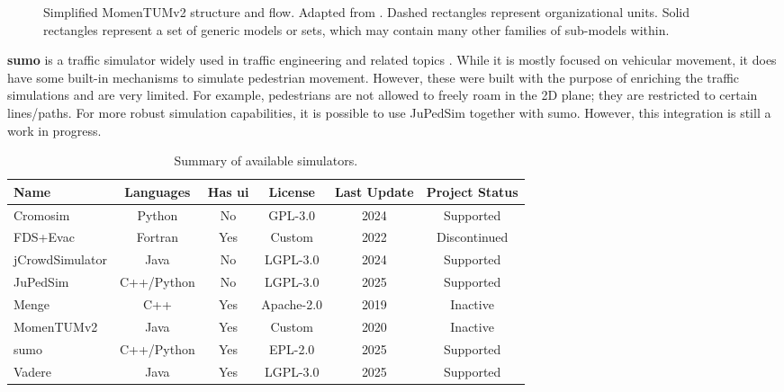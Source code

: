 \documentclass[twoside, 11pt]{article}
\begin{document}
\begin{figure}[h]
  \centering
  
  \caption[Simplified MomenTUMv2 structure and flow]{Simplified MomenTUMv2 structure and flow. Adapted from \cite{kielarMomenTUMv2ModularExtensible2016}. Dashed rectangles represent organizational units. Solid rectangles represent a set of generic models or sets, which may contain many other families of sub-models within.}
  \label{fig:momentun_architecture}
\end{figure}

\textbf{\gls{sumo}} is a traffic simulator widely used in traffic engineering and related topics \cite{SUMO2018}. While it is mostly focused on vehicular movement, it does have some built-in mechanisms to simulate pedestrian movement. However, these were built with the purpose of enriching the traffic simulations and are very limited. For example, pedestrians are not allowed to freely roam in the 2D plane; they are restricted to certain lines/paths. For more robust simulation capabilities, it is possible to use JuPedSim together with \gls{sumo}. However, this integration is still a work in progress.

\begin{center}
  \begin{table}[h!]
    \caption[Summary of available simulators]{Summary of available simulators.}
    \begin{tabularx}{\textwidth}{ | X | c | c | c | c | c | } 
      \hline
      Name & Languages & Has \gls{ui} & License & Last Update & Project Status \\ 
      \hline
      Cromosim & Python & No & GPL-3.0 & 2024 & Supported\\
      \hline
      FDS+Evac & Fortran & Yes & Custom & 2022 & Discontinued \\
      \hline
      jCrowdSimulator & Java & No & LGPL-3.0 & 2024 & Supported \\
      \hline
      JuPedSim & C++/Python & No & LGPL-3.0 & 2025 & Supported \\
      \hline
      Menge & C++ & Yes & Apache-2.0 & 2019 & Inactive \\
      \hline 
      MomenTUMv2 & Java & Yes & Custom & 2020 & Inactive \\
      \hline 
      \gls{sumo} & C++/Python & Yes & EPL-2.0 & 2025 & Supported \\
      \hline 
      Vadere & Java & Yes & LGPL-3.0 & 2025 & Supported \\
      \hline 
    \end{tabularx}
    \label{table:available-simulators-summary}
  \end{table}
\end{center}
\end{document}
